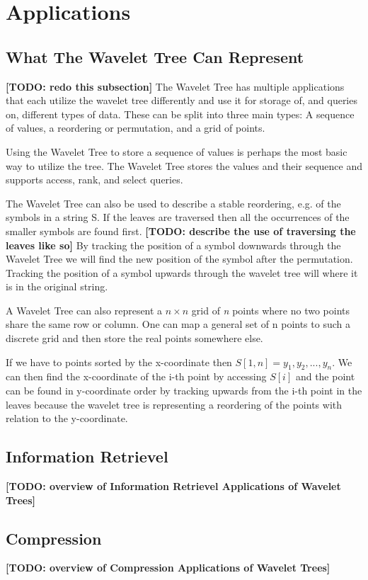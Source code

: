 \section{Applications}
\subsection{What The Wavelet Tree Can Represent}
\textbf{[TODO: redo this subsection]}
The Wavelet Tree has multiple applications that each utilize the wavelet tree differently and use it for storage of, and queries on, different types of data.
These can be split into three main types: A sequence of values, a reordering or permutation, and a grid of points.

Using the Wavelet Tree to store a sequence of values is perhaps the most basic way to utilize the tree.
The Wavelet Tree stores the values and their sequence and supports access, rank, and select queries.

The Wavelet Tree can also be used to describe a stable reordering, e.g. of the symbols in a string S. 
If the leaves are traversed then all the occurrences of the smaller symbols are found first. \textbf{[TODO: describe the use of traversing the leaves like so]}
By tracking the position of a symbol downwards through the Wavelet Tree we will find the new position of the symbol after the permutation.
Tracking the position of a symbol upwards through the wavelet tree will where it is in the original string. 

A Wavelet Tree can also represent a $n \times n$ grid of \textit{n} points where no two points share the same row or column. 
One can map a general set of n points to such a discrete grid and then store the real points somewhere else.

If we have to points sorted by the x-coordinate then $S[1,n] = y_1,y_2,...,y_n$.
We can then find the x-coordinate of the i-th point by accessing $S[i]$ and the point can be found in y-coordinate order by tracking upwards from the i-th point in the leaves because the wavelet tree is representing a reordering of the points with relation to the y-coordinate.

\subsection{Information Retrievel}
\textbf{[TODO: overview of Information Retrievel Applications of Wavelet Trees]}

\subsection{Compression}
\textbf{[TODO: overview of Compression Applications of Wavelet Trees]}
